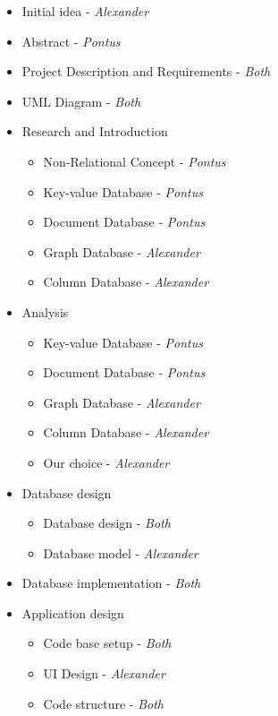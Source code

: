 \begin{itemize}
    \item Initial idea - \emph{Alexander}
    \item Abstract - \emph{Pontus}
    \item Project Description and Requirements - \emph{Both}
    \item UML Diagram - \emph{Both}
    \item Research and Introduction
        \begin{itemize}
            \item Non-Relational Concept - \emph{Pontus}
            \item Key-value Database - \emph{Pontus}
            \item Document Database - \emph{Pontus}
            \item Graph Database - \emph{Alexander}
            \item Column Database - \emph{Alexander}
        \end{itemize}
    \item Analysis
        \begin{itemize}
            \item Key-value Database - \emph{Pontus}
            \item Document Database - \emph{Pontus}
            \item Graph Database - \emph{Alexander}
            \item Column Database - \emph{Alexander}
            \item Our choice - \emph{Alexander}
        \end{itemize}
    \item Database design
        \begin{itemize}
            \item Database design - \emph{Both}
            \item Database model - \emph{Alexander}
        \end{itemize}
    \item Database implementation - \emph{Both}
    \item Application design
        \begin{itemize}
            \item Code base setup - \emph{Both}
            \item UI Design - \emph{Alexander}
            \item Code structure - \emph{Both}
        \end{itemize}

\end{itemize}
